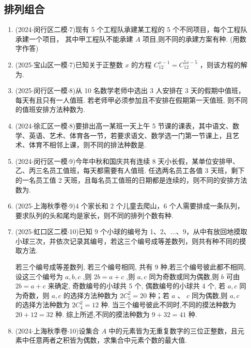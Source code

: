 \subsection*{排列组合}
\begin{enumerate}
    \item (2024$\cdot$闵行区二模$\cdot$7)现有 5 个工程队承建某工程的 5 个不同项目，每个工程队承建一个项目， 其中甲工程队不能承建 $A$ 项目,则不同的承建方案有种. (用数字作答)
    \item (2025$\cdot$宝山区一模$\cdot$7)已知关于正整数 $x$ 的方程 ${{C}}_{12}^{x - 1} = {{C}}_{12}^{{5x} - 5}$ ，则该方程的解为.
    \item (2025$\cdot$闵行区一模$\cdot$8)从 10 名数学老师中选出 3 人安排在 3 天的假期中值班，每天有且只有一人值班. 若老师甲必须参加且不安排在假期第一天值班, 则不同的值班安排方法种数为.
    \item (2024$\cdot$徐汇区一模$\cdot$8)要排出高一某班一天上午 5 节课的课表，其中语文、数学、英语、艺术、体育各一节，若要求语文、数学选一门第一节课上，且艺术、体育不相邻上课，则不同的排法种数是.
    \item (2024$\cdot$闵行区一模$\cdot$9)今年中秋和国庆共有连续 8 天小长假，某单位安排甲、乙、丙三名员工值班，每天都需要有人值班. 任选两名员工各值 3 天班，剩下的一名员工值 2 天班，且每名员工值班的日期都是连续的，则不同的安排方法数为.
    \item (2025$\cdot$上海秋季卷$\cdot$9)4 个家长和 2 个儿童去爬山，6 个人需要排成一条队列，要求队列的头和尾均是家长，则不同的排列个数有种.
    \item (2025$\cdot$虹口区二模$\cdot$10)已知 9 个小球的编号为 1、2、...、9，从中有放回地摸取小球三次，并依次记录其编号，若这三个编号成等差数列，则共有种不同的摸取方法.
    \begin{jieda}
        若三个编号成等差数列, 若三个编号相同, 共有 9 种,若三个编号彼此都不相同,设这三个编号为 $a,b,c$ ,则 ${2b} = a + c$ ,则 $a,c$ 同为奇数或同为偶数,则 $b$ 可由 ${2b} = a + c$ 来确定, 奇数编号的小球共 5 个, 偶数编号的小球共 4 个, 若 $a,c$ 同为奇数，则 $a,c$ 的选择方法种数为 $2{{C}}_{5}^{2} = {20}$ 种；若 $a$ 、 $c$ 同为偶数,则 $a,c$ 的选择方法种数为 $2{{C}}_{4}^{2} = {12}$ 种. 当三个编号彼此不同时,不同的摸法种数为 ${20} + {12} = {32}$ 种. 综上所述,不同的摸法种数为 $9 + {32} = {41}$ 种.
    \end{jieda}
    \item (2024$\cdot$上海秋季卷$\cdot$10)设集合 $A$ 中的元素皆为无重复数字的三位正整数，且元素中任意两者之积皆为偶数，求集合中元素个数的最大值.


\end{enumerate}
